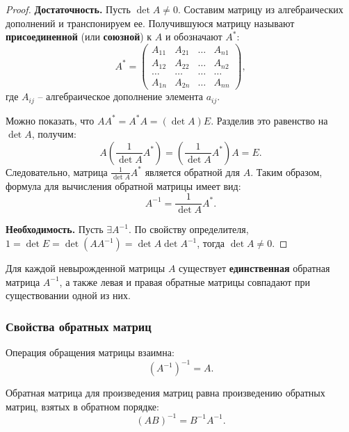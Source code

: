 \documentclass[10pt]{article}
\begin{document}
\begin{proof}
\textbf{Достаточность.} Пусть \(\det A \neq 0\). Составим матрицу из алгебраических дополнений и транспонируем ее. Получившуюся матрицу называют \textbf{присоединенной} (или \textbf{союзной}) к \(A\) и обозначают \(A^{*}\):
\[
A^{*} = \begin{pmatrix}
A_{11} & A_{21} & \dots & A_{n1} \\
A_{12} & A_{22} & \dots & A_{n2} \\
\dots & \dots & \dots & \dots \\
A_{1n} & A_{2n} & \dots & A_{nn}
\end{pmatrix},
\]
где \(A_{ij}\) – алгебраическое дополнение элемента \(a_{ij}\).

Можно показать, что \(A A^{*} = A^{*} A = (\det A) E\). Разделив это равенство на \(\det A\), получим:
\[
A \left( \frac{1}{\det A} A^{*} \right) = \left( \frac{1}{\det A} A^{*} \right) A = E.
\]
Следовательно, матрица \(\frac{1}{\det A} A^{*}\) является обратной для \(A\). Таким образом, формула для вычисления обратной матрицы имеет вид:
\begin{equation} \label{eq:inverse_formula}
A^{-1} = \frac{1}{\det A} A^{*}.
\end{equation}

\textbf{Необходимость.} Пусть $\exists A^{-1}$. По свойству определителя, $1 = \det E = \det (AA^{-1}) = \det A \det A^{-1}$, тогда $\det A \neq 0$.
\end{proof}

\begin{remark}
Для каждой невырожденной матрицы \(A\) существует \textbf{единственная} обратная матрица \(A^{-1}\), а также левая и правая обратные матрицы совпадают при существовании одной из них.
\end{remark}

\subsubsection*{Свойства обратных матриц}

\begin{property}
Операция обращения матрицы взаимна:
\[
(A^{-1})^{-1} = A.
\]
\end{property}

\begin{property}
Обратная матрица для произведения матриц равна произведению обратных матриц, взятых в обратном порядке:
\[
(AB)^{-1} = B^{-1} A^{-1}.
\]
\end{property}
\end{document}

